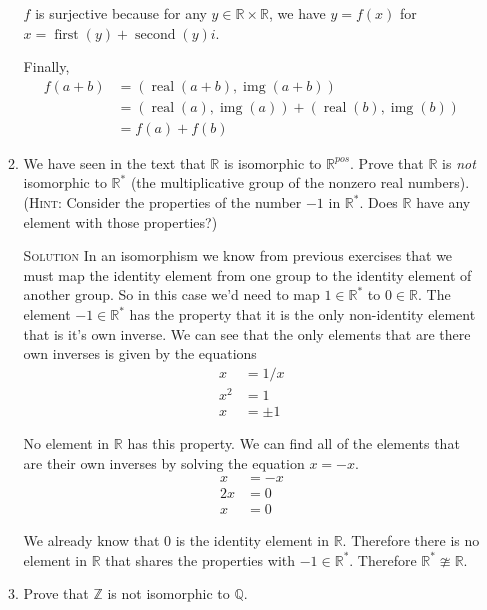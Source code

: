 \documentclass[twoside]{amsart}
\newcommand{\Reals}{\ensuremath{\mathbb{R}}\xspace}
\newcommand{\Integers}{\ensuremath{\mathbb{Z}{}}\xspace}
\newcommand{\solution}{\textsc{Solution}\xspace}
\newcommand{\niso}{\ncong}
\newcommand{\blank}{\vspace{5pt}}
\newcommand{\real}{\mathop{\mathrm{real}}}
\newcommand{\img}{\mathop{\mathrm{img}}}
\newcommand{\first}{\mathop{\mathrm{first}}}
\newcommand{\second}{\mathop{\mathrm{second}}}
\begin{document}
\begin{enumerate}[A.]
\begin{enumerate}[1]
      $f$ is surjective because for any $y \in \mathbb{R} \times \mathbb{R}$,
      we have $y = f(x)$ for $x = \first(y) + \second(y)i$.

      Finally,
      \begin{align*}
         f(a + b) &= (\real(a + b), \img(a + b))  \\
                  &= (\real(a),\img(a)) + (\real(b),\img(b)) \\
                  &= f(a) + f(b)
      \end{align*}

      \item We have seen in the text that $\Reals$ is isomorphic to 
      $\Reals^{pos}$. Prove that $\Reals$ is \emph{not} isomorphic
      to $\Reals^*$ (the multiplicative group of the nonzero real numbers).
      (\textsc{Hint}: Consider the properties of the number $-1$ in
      $\Reals^*$. Does $\Reals$ have any element with those properties?)


      \blank \noindent \solution In an isomorphism we know from previous
      exercises that we must map the identity element from one group
      to the identity element of another group. So in this case
      we'd need to map $1 \in \Reals^*$ to $0 \in \Reals$. The
      element $-1 \in \Reals^*$ has the property that it is the only
      non-identity element that is it's own inverse. We can see
      that the only elements that are there own inverses is given by
      the equations
      \begin{align*}
         x &= 1/x \\ 
         x^2 &= 1 \\
         x &= \pm 1
      \end{align*}

      No element in $\Reals$ has this property. We can find all
      of the elements that are their own inverses by solving the 
      equation $x = -x$.
      \begin{align*}
          x &= -x \\
          2x &= 0 \\
          x &= 0
      \end{align*}

      We already know that 0 is the identity element in $\Reals$. Therefore
      there is no element in $\Reals$ that shares the properties with
      $-1 \in \Reals^*$. Therefore $\Reals^* \niso \Reals$.

      \blank
      \item Prove that $\Integers$ is not isomorphic to $\mathbb{Q}$.


\end{enumerate}
\end{enumerate}
\end{document}
